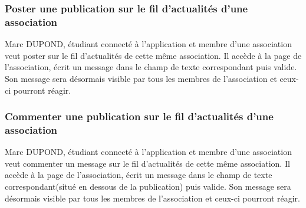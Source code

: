 \subsubsection*{Poster une publication sur le fil d’actualités d’une association}
Marc DUPOND, étudiant connecté à l’application et membre d’une association veut poster sur le fil d’actualités de cette même association. Il accède à la page de l’association, écrit un message dans le champ de texte correspondant puis valide. Son message sera désormais visible par tous les membres de l’association et ceux-ci pourront réagir.
\subsubsection*{Commenter une publication sur le fil d’actualités d’une association}
Marc DUPOND, étudiant connecté à l’application et membre d’une association veut commenter un message sur le fil d’actualités de cette même association. Il accède à la page de l’association, écrit un message dans le champ de texte correspondant(situé en dessous de la publication) puis valide. Son message sera désormais visible par tous les membres de l’association et ceux-ci pourront réagir.